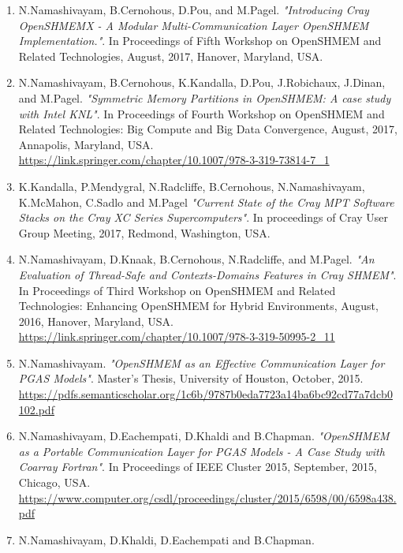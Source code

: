 \begin{enumerate}
\setcounter{enumi}{0}
\item N.Namashivayam, B.Cernohous, D.Pou, and M.Pagel.
      \textit{"Introducing Cray OpenSHMEMX - A Modular Multi-Communication Layer
      OpenSHMEM Implementation."}. In Proceedings of Fifth Workshop on OpenSHMEM
      and Related Technologies, August, 2017, Hanover, Maryland, USA.
\item N.Namashivayam, B.Cernohous, K.Kandalla, D.Pou,
      J.Robichaux, J.Dinan, and M.Pagel.
      \textit{"Symmetric Memory Partitions in OpenSHMEM: A case study with
      Intel KNL"}. In Proceedings of Fourth Workshop on OpenSHMEM and
      Related Technologies: Big Compute and Big Data Convergence, August,
      2017, Annapolis, Maryland, USA.\\
      \url{https://link.springer.com/chapter/10.1007/978-3-319-73814-7_1}
\item K.Kandalla, P.Mendygral, N.Radcliffe, B.Cernohous,
      N.Namashivayam, K.McMahon, C.Sadlo and M.Pagel
      \textit{"Current State of the Cray MPT Software Stacks on the Cray XC
      Series Supercomputers"}. In proceedings of Cray User Group Meeting,
      2017, Redmond, Washington, USA.
\item N.Namashivayam, D.Knaak, B.Cernohous, N.Radcliffe, and
      M.Pagel.
      \textit{"An Evaluation of Thread-Safe and Contexts-Domains Features in
      Cray SHMEM"}. In Proceedings of Third Workshop on OpenSHMEM and Related
      Technologies: Enhancing OpenSHMEM for Hybrid Environments, August, 2016,
      Hanover, Maryland, USA.\\
      \url{https://link.springer.com/chapter/10.1007/978-3-319-50995-2_11}
\item N.Namashivayam.
      \textit{"OpenSHMEM as an Effective Communication Layer for PGAS Models"}.
      Master's Thesis, University of Houston, October, 2015.\\
      \url{https://pdfs.semanticscholar.org/1c6b/9787b0eda7723a14ba6bc92cd77a7dcb0102.pdf}
\item N.Namashivayam, D.Eachempati, D.Khaldi and B.Chapman.
      \textit{"OpenSHMEM as a Portable Communication Layer for PGAS Models - A
      Case Study with Coarray Fortran"}. In Proceedings of IEEE Cluster 2015,
      September, 2015, Chicago, USA.\\
      \url{https://www.computer.org/csdl/proceedings/cluster/2015/6598/00/6598a438.pdf}
\item N.Namashivayam, D.Khaldi, D.Eachempati and B.Chapman.

\end{enumerate}
